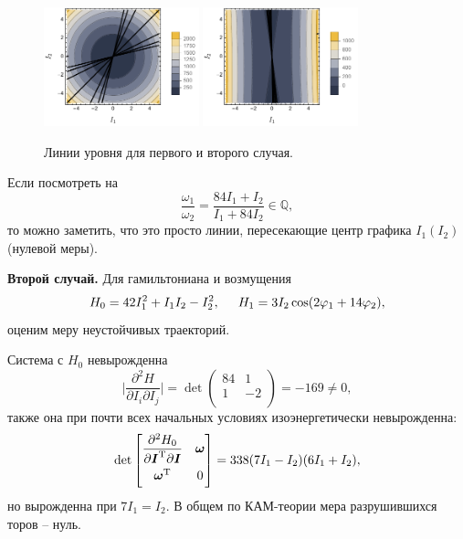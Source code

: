 \begin{figure}[h]
    \centering
    \includegraphics[width=0.4\textwidth]{figures/H1.pdf}
    \hspace{10 mm} 
    \includegraphics[width=0.4\textwidth]{figures/H2.pdf}
    \caption{Линии уровня для первого и второго случая.}
\end{figure}

Если посмотреть на
\begin{equation*}
    \frac{\omega_1}{\omega_2} = \frac{84 I_1 + I_2}{I_1 + 84 I_2} \in \mathbb{Q},
\end{equation*}
то можно заметить, что это просто линии, пересекающие центр графика $I_1(I_2)$ (нулевой меры). 



\textbf{Второй случай.} Для гамильтониана и возмущения
\begin{equation*}
    H_0 = 42 I_1^2 + I_1 I_2 - I_2^2,
    \hspace{5 mm} 
    H_1 = 3 I_2 \cos(2 \varphi_1 + 14 \varphi_2),
\end{equation*}
оценим меру неустойчивых траекторий. 

Система с $H_0$ невырожденна
\begin{equation*}
    \bigg| \frac{\partial^2 H}{\partial I_i \partial I_j} \bigg| = \det \begin{pmatrix}
        84 & 1  \\
        1 & -2  \\
    \end{pmatrix} = - 169 \neq 0,
\end{equation*}
также она при почти всех начальных условиях изоэнергетически невырожденна:
\begin{equation*}
         \det \begin{bmatrix}
        \vphantom{\dfrac{1}{2}}
            \dfrac{\partial^2 H_0}{\partial \vc{I}\T \partial \vc{I}} & \vc{\omega} \\
        \vphantom{\dfrac{1}{2}}
            \vc{\omega}\T & 0
        \end{bmatrix}  = 338 (7 I_1 - I_2)(6 I_1 + I_2),
\end{equation*}
но вырожденна при $7 I_1 = I_2$. В общем по КАМ-теории мера разрушившихся торов -- нуль.

